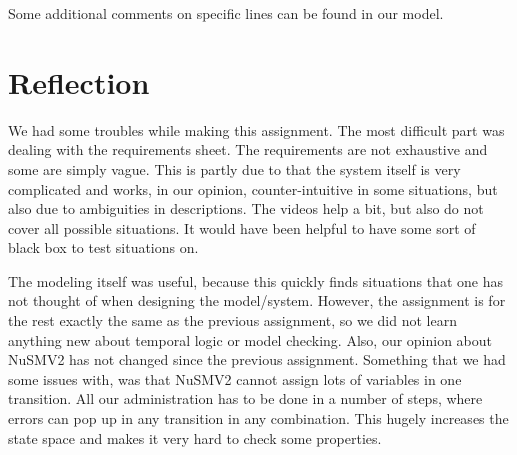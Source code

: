 \documentclass[a4paper,10pt]{article}
\begin{document}
	Some additional comments on specific lines can be found in our model.

	\section{Reflection}
	We had some troubles while making this assignment. The most difficult part was dealing with the requirements sheet. The requirements are not exhaustive and some are simply vague. This is partly due to that the system itself is very complicated and works, in our opinion, counter-intuitive in some situations, but also due to ambiguities in descriptions. The videos help a bit, but also do not cover all possible situations. It would have been helpful to have some sort of black box to test situations on.
	
	The modeling itself was useful, because this quickly finds situations that one has not thought of when designing the model/system. However, the assignment is for the rest exactly the same as the previous assignment, so we did not learn anything new about temporal logic or model checking. Also, our opinion about NuSMV2 has not changed since the previous assignment. Something that we had some issues with, was that NuSMV2 cannot assign lots of variables in one transition. All our administration has to be done in a number of steps, where errors can pop up in any transition in any combination. This hugely increases the state space and makes it very hard to check some properties.
\end{document}
